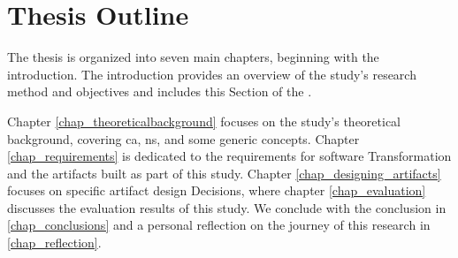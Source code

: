 \section{Thesis Outline} \label{sec_structure}

The thesis is organized into seven main chapters, beginning with the introduction. The
introduction provides an overview of the study's research method and objectives and
includes this Section of the .

Chapter \ref{chap_theoreticalbackground} focuses on the study's theoretical background,
covering \gls{ca}, \gls{ns}, and some generic concepts. Chapter \ref{chap_requirements} is
dedicated to the requirements for software Transformation and the artifacts built as part
of this study. Chapter \ref{chap_designing_artifacts} focuses on specific artifact design
Decisions, where chapter \ref{chap_evaluation} discusses the evaluation results of this
study. We conclude with the conclusion in \ref{chap_conclusions} and a personal reflection
on the journey of this research in \ref{chap_reflection}.